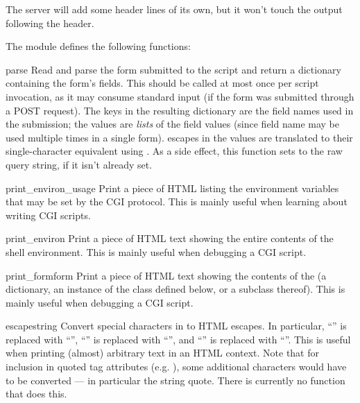 The server will add some header lines of its own, but it won't touch
the output following the header.

The  module defines the following functions:

\begin{funcdesc}{parse}{}
Read and parse the form submitted to the script and return a
dictionary containing the form's fields.  This should be called at
most once per script invocation, as it may consume standard input (if
the form was submitted through a POST request).  The keys in the
resulting dictionary are the field names used in the submission; the
values are {\em lists} of the field values (since field name may be
used multiple times in a single form).  \samp{\%} escapes in the
values are translated to their single-character equivalent using
.  As a side effect, this function sets
 to the raw query string, if it isn't
already set.
\end{funcdesc}

\begin{funcdesc}{print_environ_usage}{}
Print a piece of HTML listing the environment variables that may be
set by the CGI protocol.
This is mainly useful when learning about writing CGI scripts.
\end{funcdesc}

\begin{funcdesc}{print_environ}{}
Print a piece of HTML text showing the entire contents of the shell
environment.  This is mainly useful when debugging a CGI script.
\end{funcdesc}

\begin{funcdesc}{print_form}{form}
Print a piece of HTML text showing the contents of the  (a
dictionary, an instance of the  class defined
below, or a subclass thereof).
This is mainly useful when debugging a CGI script.
\end{funcdesc}

\begin{funcdesc}{escape}{string}
Convert special characters in  to HTML escapes.  In
particular, ``\code{\&}'' is replaced with ``'',
``\code{<}'' is replaced with ``'', and ``\code{>}'' is
replaced with ``''.  This is useful when printing (almost)
arbitrary text in an HTML context.  Note that for inclusion in quoted
tag attributes (e.g. ), some additional
characters would have to be converted --- in particular the string
quote.  There is currently no function that does this.
\end{funcdesc}

